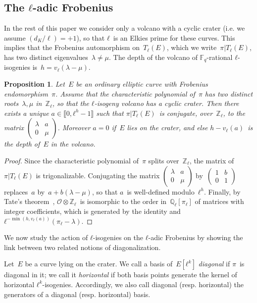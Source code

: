 \documentclass{lms}
\newtheorem{prop}[thm]{Proposition}
\newcommand{\F}{\mathbb{F}}
\begin{document}
\subsection{The $ℓ$-adic Frobenius}

In the rest of this paper we consider only a volcano with a cyclic
crater (i.e. we assume $(d_K/\ell) = +1$),
so that $ℓ$~is an Elkies prime for these curves.
This implies that the Frobenius automorphism on~$T_ℓ(E)$,
which we write~$π|T_ℓ(E)$, has two distinct eigenvalues~$λ ≠ μ$.
The depth of the volcano of $\F_q$-rational $ℓ$-isogenies
is~$h = v_ℓ(λ-μ)$.

\begin{prop}\label{prop:matrice-frobenius}
Let~$E$ be an ordinary elliptic curve with Frobenius endomorphism~$π$.
Assume that the characteristic polynomial of~$π$
has two distinct roots~$λ, μ$ in~$ℤ_ℓ$,
so that the $ℓ$-isogeny volcano has a cyclic crater.
Then there exists a unique $a ∈ \llbracket 0, ℓ^h - 1 \rrbracket$
such that $π|T_ℓ(E)$~is conjugate, over~$ℤ_ℓ$,
to the matrix $\left ( \begin{smallmatrix}λ & a\\ 0 & μ
\end{smallmatrix}\right )$.
Moreover $a = 0$ if~$E$ lies on the crater,
and else $h - v_{ℓ}(a)$~is the depth of~$E$ in the volcano.
\end{prop}
\begin{proof}
Since the characteristic polynomial of~$π$ splits over~$ℤ_ℓ$,
the matrix of~$π|T_ℓ(E)$ is trigonalizable.
Conjugating the matrix $\left ( \begin{smallmatrix}λ & a\\0 & μ
\end{smallmatrix}\right )$ by~$\left ( \begin{smallmatrix}1 & b\\0 & 1
\end{smallmatrix} \right )$ replaces~$a$ by~$a + b (λ - μ)$,
so that $a$~is well-defined modulo~$ℓ^h$.
Finally, by Tate's theorem~\cite[Isogeny theorem 7.7 (a)]{Sil},
$\mathcal O ⊗ ℤ_ℓ$~is isomorphic to the order in~$ℚ_ℓ[π_ℓ]$
of matrices with integer coefficients,
which is generated by the identity and~$ℓ^{-\min (h, v_ℓ(a))} (π_ℓ-λ)$.
\end{proof}

We now study the action of $ℓ$-isogenies on the $ℓ$-adic Frobenius by
showing the link between two related notions of diagonalization.

\begin{defi}
  Let~$E$ be a curve lying on the crater. We call a
  basis of~$E[ℓ^k]$ \emph{diagonal} if $π$~is diagonal in it; we call
  it \emph{horizontal} if both basis points generate the kernel of
  horizontal $ℓ^k$-isogenies. Accordingly, we also call diagonal
  (resp. horizontal) the generators of a diagonal (resp. horizontal)
  basis.
\end{defi}
\end{document}
